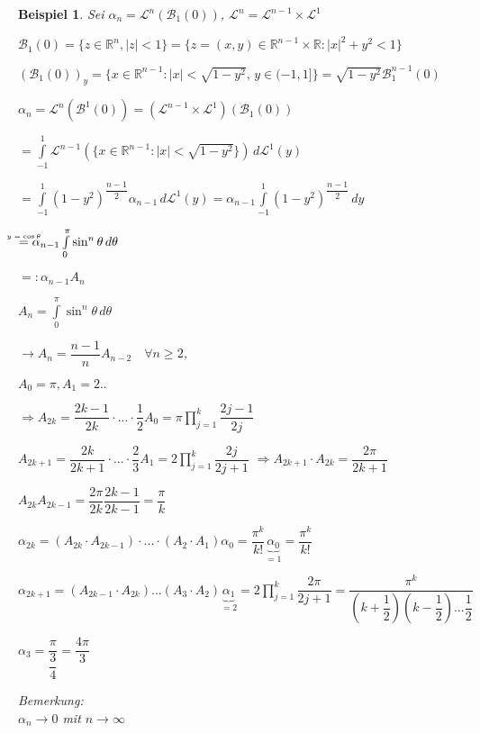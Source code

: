 \documentclass[11pt]{memoir}
\theoremstyle{changebreak}
\newtheorem{Beispiel}{Beispiel}[chapter]
\newcommand\overequal[1]{\mathrel{\overset{\makebox[0pt]{\mbox{\normalfont\tiny\sffamily $ #1 $}}}{=}}}
\begin{document}
\begin{Beispiel}
Sei $\alpha_n = \mathscr L^n(\mathscr B_1(0))$,
$\mathscr L^n = \mathscr L^{n-1} \times \mathscr L^1$\\
\par
$\mathscr B_1(0) = \{z \in \mathbb R^n,|z| < 1\} = \{z = (x, y) \in \mathbb R^{n-1} \times \mathbb R: |x|^2 + y^2 <1\} $
\par\bigskip
$(\mathscr B_1(0))_y = \{x \in \mathbb R^{n-1}: |x| < \sqrt{1-y^2},\,  y \in (-1, 1]\} = \sqrt{1-y^2}\mathscr B_1^{n-1} (0) $
\par\bigskip
$\alpha_n = \mathscr L^n(\mathscr B^1(0)) = (\mathscr L^{n-1} \times \mathscr L^1)(\mathscr B_1(0))$
\par\bigskip
$ = \int\limits_{-1}^1 \mathscr L^{n-1}\left(\{x \in \mathbb R^{n-1}: |x| < \sqrt{1 -y^2}\}\right)\, d\mathscr L^1(y) $
\par\bigskip
$=\int\limits_{-1}^1 (1- y^2)^{\dfrac{n-1}{2}} \alpha_{n-1}\, d\mathscr L^1(y) = \alpha_{n-1} \int\limits_{-1}^1 (1 - y^2)^{\dfrac{n-1}{2}} \, dy $
\par\bigskip
$\overequal{y = \cos{\theta}}  \alpha_{n-1} \int\limits_0^\pi \sin^n \theta \, d\theta $
\par\bigskip
$=: \alpha_{n-1} A_n$  \\
\par\bigskip
$A_n = \int\limits_0^\pi \sin^n \theta\, d\theta$
\par\bigskip
$\rightarrow A_n = \dfrac{n-1}{n} A_{n-2}\quad \forall n \geq 2$,
\par\bigskip
 $A_0 = \pi, A_1 = 2..$
 \par\bigskip
$\Rightarrow A_{2k} = \dfrac{2k -1}{2k} \cdotp ... \cdotp \dfrac{1}{2} A_0 = \pi \prod\limits_{j=1}^k \dfrac{2j -1}{2j}$
\par\bigskip
$A_{2k+1} = \dfrac{2k}{2k+1} \cdotp ... \cdotp \dfrac{2}{3} A_1 = 2 \prod\limits_{j=1}^k \dfrac{2j}{2j+1}$
$\Rightarrow A_{2k+1} \cdotp A_{2k} = \dfrac{2\pi}{2k +1}$
\par\bigskip
$A_{2k} A_{2k-1} = \dfrac{2\pi}{2k} \dfrac{2k-1}{2k-1} = \dfrac{\pi}{k}$
\par\bigskip
$\alpha_{2k} = (A_{2k} \cdotp A_{2k-1})\cdotp ... \cdotp (A_2 \cdotp A_1) \alpha_0 = \dfrac{\pi^k}{k!}\underbrace{\alpha_0}_{=1} = \dfrac{\pi^k}{k!}$
\par\bigskip
$\alpha_{2k+1} = (A_{2k-1}\cdotp A_{2k}) ... (A_3 \cdotp A_2) \underbrace{\alpha_1}_{=2} = 2 \prod\limits_{j=1}^k \dfrac{2\pi}{2j+1} = \dfrac{\pi^k}{\left(k + \dfrac{1}{2}\right)\left(k- \dfrac{1}{2}\right)... \dfrac{1}{2}}$
\par\bigskip
$\alpha_3 = \dfrac{\pi}{\dfrac{3}{4}} = \dfrac{4\pi}{3}$
\par\bigskip
\emph{Bemerkung}: \\

$\alpha_n \rightarrow 0$ mit $n \rightarrow \infty$
\end{Beispiel}
\end{document}
